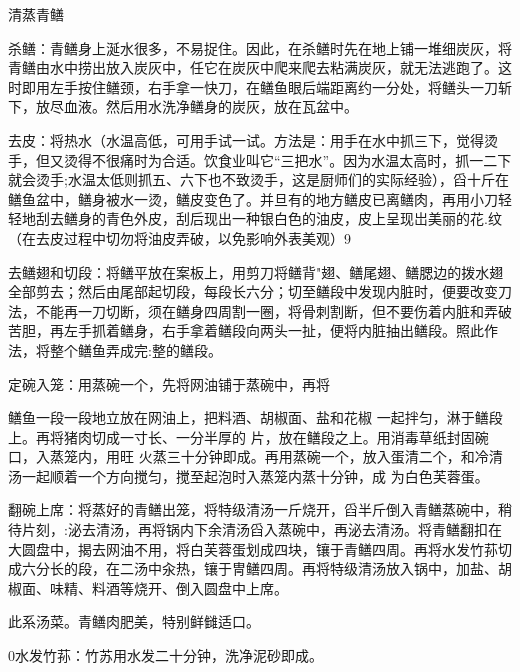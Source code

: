 \begin{recipe}{清蒸青鳝}

\ingredients



\cooking

\step 杀鳝：青鳝身上涎水很多，不易捉住。因此，在杀鳝时先在地上铺一堆细炭灰，将青鳝由水中捞出放入炭灰中，任它在炭灰中爬来爬去粘满炭灰，就无法逃跑了。这时即用左手按住鳝颈，右手拿一快刀，在鳝鱼眼后端距离约一分处，将鳝头一刀斩下，放尽血液。然后用水洗净鳝身的炭灰，放在瓦盆中。

\step 去皮：将热水（水温高低，可用手试一试。方法是：用手在水中抓三下，觉得烫手，但又烫得不很痛时为合适。饮食业叫它“三把水”。因为水温太高时，抓一二下就会烫手;水温太低则抓五、六下也不致烫手，这是厨师们的实际经验），舀十斤在鳝鱼盆中，鳝身被水一烫，鳝皮变色了。并旦有的地方鳝皮已离鳝肉，再用小刀轻轻地刮去鳝身的青色外皮，刮后现出一种银白色的油皮，皮上呈现岀美丽的花.纹（在去皮过程中切勿将油皮弄破，以免影响外表美观）9

\step 去鳝翅和切段：将鳝平放在案板上，用剪刀将鳝背"翅、鳝尾翅、鳝腮边的拨水翅全部剪去；然后由尾部起切段，每段长六分；切至鳝段中发现内脏时，便要改变刀法，不能再一刀切断，须在鳝身四周割一圈，将骨刺割断，但不要伤着内脏和弄破苦胆，再左手抓着鳝身，右手拿着鳝段向两头一扯，便将内脏抽出鳝段。照此作法，将整个鳝鱼弄成完:整的鳝段。

\step 定碗入笼：用蒸碗一个，先将网油铺于蒸碗中，再将

鳝鱼一段一段地立放在网油上，把料酒、胡椒面、盐和花椒 一起拌匀，淋于鳝段上。再将猪肉切成一寸长、一分半厚的 片，放在鳝段之上。用消毒草纸封固碗口，入蒸笼内，用旺 火蒸三十分钟即成。再用蒸碗一个，放入蛋清二个，和冷清 汤一起顺着一个方向搅匀，搅至起泡时入蒸笼内蒸十分钟，成 为白色芙蓉蛋。

\step 翻碗上席：将蒸好的青鳝出笼，将特级清汤一斤烧开，舀半斤倒入青鳝蒸碗中，稍待片刻，:泌去清汤，再将锅内下余清汤舀入蒸碗中，再泌去清汤。将青鳝翻扣在大圆盘中，揭去网油不用，将白芙蓉蛋划成四块，镶于青鳝四周。再将水发竹荪切成六分长的段，在二汤中汆热，镶于冑鳝四周。再将特级清汤放入锅中，加盐、胡椒面、味精、料酒等烧开、倒入圆盘中上席。

\notes

此系汤菜。青鳝肉肥美，特别鲜雠适口。

0水发竹荪：竹苏用水发二十分钟，洗净泥砂即成。

\end{recipe}


